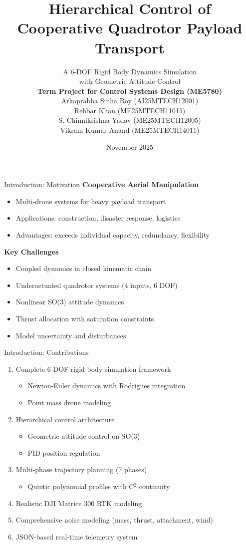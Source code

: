 \documentclass{beamer}
\title{Hierarchical Control of \\Cooperative Quadrotor Payload Transport}
\author{
    A 6-DOF Rigid Body Dynamics Simulation\\ with Geometric Attitude Control \\
    \vspace{0.5cm}
    \small \textbf{Term Project for Control Systems Design (ME5780)} \\
    \vspace{0.5cm}
    \normalsize
    Arkaprabha Sinha Roy (AI25MTECH12001) \\
    Rehbar Khan (ME25MTECH11015) \\
    S. Chinnikrishna Yadav (ME25MTECH12005) \\
    Vikram Kumar Anand (ME25MTECH14011)
}
\institute{Indian Institute of Technology Hyderabad}
\date{\small November 2025}
\begin{document}
\frame{\titlepage}

\begin{frame}{Introduction: Motivation}
\textbf{Cooperative Aerial Manipulation}
\begin{itemize}
    \item Multi-drone systems for heavy payload transport
    \item Applications: construction, disaster response, logistics
    \item Advantages: exceeds individual capacity, redundancy, flexibility
\end{itemize}

\vspace{0.5cm}
\textbf{Key Challenges}
\begin{itemize}
    \item Coupled dynamics in closed kinematic chain
    \item Underactuated quadrotor systems (4 inputs, 6 DOF)
    \item Nonlinear SO(3) attitude dynamics
    \item Thrust allocation with saturation constraints
    \item Model uncertainty and disturbances
\end{itemize}
\end{frame}

\begin{frame}{Introduction: Contributions}
\begin{enumerate}
    \item Complete 6-DOF rigid body simulation framework
    \begin{itemize}
        \item Newton-Euler dynamics with Rodrigues integration
        \item Point mass drone modeling
    \end{itemize}
    \item Hierarchical control architecture
    \begin{itemize}
        \item Geometric attitude control on SO(3)
        \item PID position regulation
    \end{itemize}
    \item Multi-phase trajectory planning (7 phases)
    \begin{itemize}
        \item Quintic polynomial profiles with C$^2$ continuity
    \end{itemize}
    \item Realistic DJI Matrice 300 RTK modeling
    \item Comprehensive noise modeling (mass, thrust, attachment, wind)
    \item JSON-based real-time telemetry system
\end{enumerate}
\end{frame}
\end{document}
